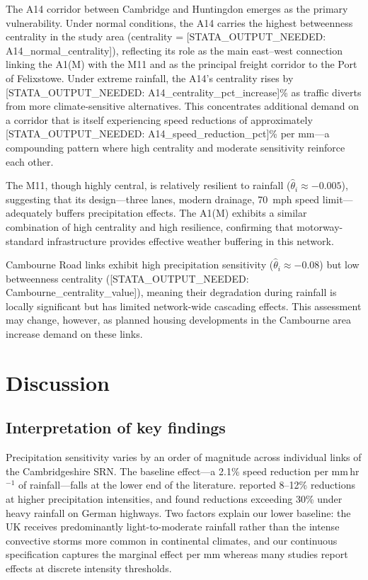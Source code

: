 \documentclass[review]{elsarticle}
\begin{document}
The A14 corridor between Cambridge and Huntingdon emerges as the primary vulnerability. Under normal conditions, the A14 carries the highest betweenness centrality in the study area (centrality = [STATA\_OUTPUT\_NEEDED: A14\_normal\_centrality]), reflecting its role as the main east--west connection linking the A1(M) with the M11 and as the principal freight corridor to the Port of Felixstowe. Under extreme rainfall, the A14's centrality rises by [STATA\_OUTPUT\_NEEDED: A14\_centrality\_pct\_increase]\% as traffic diverts from more climate-sensitive alternatives. This concentrates additional demand on a corridor that is itself experiencing speed reductions of approximately [STATA\_OUTPUT\_NEEDED: A14\_speed\_reduction\_pct]\% per mm---a compounding pattern where high centrality and moderate sensitivity reinforce each other.

The M11, though highly central, is relatively resilient to rainfall ($\hat{\theta}_i \approx -0.005$), suggesting that its design---three lanes, modern drainage, 70~mph speed limit---adequately buffers precipitation effects. The A1(M) exhibits a similar combination of high centrality and high resilience, confirming that motorway-standard infrastructure provides effective weather buffering in this network.

Cambourne Road links exhibit high precipitation sensitivity ($\hat{\theta}_i \approx -0.08$) but low betweenness centrality ([STATA\_OUTPUT\_NEEDED: Cambourne\_centrality\_value]), meaning their degradation during rainfall is locally significant but has limited network-wide cascading effects. This assessment may change, however, as planned housing developments in the Cambourne area increase demand on these links.


\section{Discussion}
\label{sec:discussion}

\subsection{Interpretation of key findings}
\label{sec:disc:summary}

Precipitation sensitivity varies by an order of magnitude across individual links of the Cambridgeshire SRN. The baseline effect---a 2.1\% speed reduction per mm\,hr$^{-1}$ of rainfall---falls at the lower end of the literature. \citet{hranac2006empirical} reported 8--12\% reductions at higher precipitation intensities, and \citet{becker2026rainfall} found reductions exceeding 30\% under heavy rainfall on German highways. Two factors explain our lower baseline: the UK receives predominantly light-to-moderate rainfall rather than the intense convective storms more common in continental climates, and our continuous specification captures the marginal effect per mm whereas many studies report effects at discrete intensity thresholds.
\end{document}
